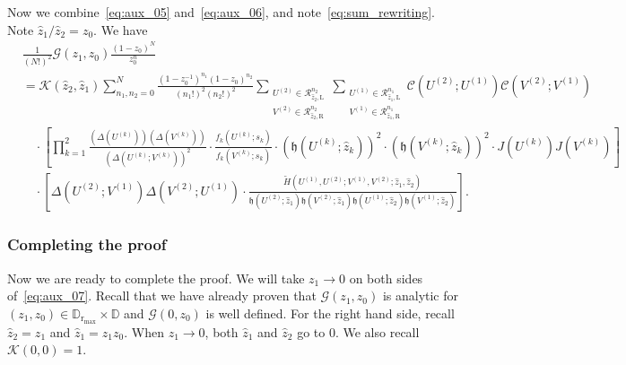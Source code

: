\documentclass{article}
\numberwithin{equation}{section}
\newcommand{\Ch}{\mathcal{C}}
\newcommand{\LL}{\mathrm{L}}
\newcommand{\RR}{\mathrm{R}}
\newcommand{\rr}{\mathrm{r_{max}}}
\begin{document}
\bigskip
Now we combine~\eqref{eq:aux_05} and~\eqref{eq:aux_06}, and note~\eqref{eq:sum_rewriting}. Note $\hat z_1/\hat z_2 =z_0$. We have
\begin{equation}
	\label{eq:aux_07}
	\begin{split}
		&\frac{1}{(N!)^2}\mathcal{G}(z_1,z_0)\frac{(1-z_0)^N}{z_0^n}\\
		&=\mathcal{K}(\hat z_2,\hat z_1)\sum_{n_1,n_2=0}^N \frac{(1-z_0^{-1})^{n_1}
			(1-z_0)^{n_2}}{(n_1!)^2(n_2!)^2}\sum_{\substack{U^{(2)} \in \mathcal{R}_{\hat z_2,\LL}^{n_2}\\ V^{(2)} \in \mathcal{R}_{\hat z_2,\RR}^{n_2}}}\sum_{\substack{U^{(1)} \in \mathcal{R}_{\hat z_1,\LL}^{n_1}\\ V^{(1)} \in \mathcal{R}_{\hat z_1,\RR}^{n_1}}}
		\Ch(U^{(2)};U^{(1)})\Ch(V^{(2)};V^{(1)})\\
		&\quad\cdot \left[  
		\prod_{k=1}^2
		\frac{(\Delta(U^{(k)}))(\Delta(V^{(k)}))}
		{(\Delta(U^{(k)};V^{(k)}))^2}
		\cdot
		\frac{f_k(U^{(k)};s_k)}{f_k(V^{(k)};s_k)}
		\cdot
		\left( \mathfrak{h}(U^{(k)};\hat z_k)
		\right)^2
		\cdot
		\left( \mathfrak{h}(V^{(k)};\hat z_k)
		\right)^2
		\cdot 
		J(U^{(k)}) J(V^{(k)})
		\right]\\
		&\quad \cdot 
		\left[
		{
			\Delta(U^{(2)};V^{(1)}) \Delta (V^{(2)}; U^{(1)})
		}        
		\cdot
		\frac{
			\tilde H(U^{(1)},U^{(2)};V^{(1)},V^{(2)};\hat z_1,\hat z_2)
		}
		{
			\mathfrak{h}(U^{(2)};\hat z_1)
			\mathfrak{h}(V^{(2)};\hat z_1)	
			\mathfrak{h}(U^{(1)};\hat z_2)
			\mathfrak{h}(V^{(1)};\hat z_2)
		}
		\right].
	\end{split}
\end{equation}

\subsubsection{Completing the proof}

Now we are ready to complete the proof. We will take $z_1\to 0$ on both sides of~\eqref{eq:aux_07}. Recall that we have already proven that $\mathcal{G}(z_1,z_0)$ is analytic for $(z_1,z_0)\in\mathbb{D}_\rr\times\mathbb{D}$ and $\mathcal{G}(0,z_0)$ is well defined. For the right hand side, recall $\hat z_2=z_1$ and $\hat z_1=z_1z_0$. When $z_1\to 0$, both $\hat z_1$ and $\hat z_2$ go to $0$. We also recall $\mathcal{K}(0,0)=1$.
\end{document}

